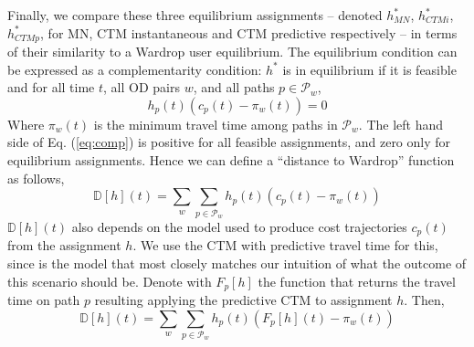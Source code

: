 Finally, we compare these three equilibrium assignments -- denoted $h^*_{MN}$, $h^*_{CTMi}$, $h^*_{CTMp}$, for MN, CTM instantaneous and CTM predictive respectively -- in terms of their similarity to a Wardrop user equilibrium. The equilibrium condition can be expressed as a complementarity condition: $h^*$ is in equilibrium  if it is feasible and for all time $t$, all OD pairs $w$, and all paths $p\in\mathcal{P}_w$,
\begin{equation}
\label{eq:comp}
h_p(t)\left(c_p(t)-\pi_w(t)\right) = 0
\end{equation}
Where $\pi_w(t)$ is the minimum travel time among paths in $\mathcal{P}_w$. The left hand side of Eq. (\ref{eq:comp}) is positive for all feasible assignments, and zero only for equilibrium assignments. Hence we can define a ``distance to Wardrop'' function as follows,
\begin{equation}
\mathbb{D}[h](t) =\sum_w \sum_{p\in\mathcal{P}_w} h_p(t)\left(c_p(t)-\pi_w(t)\right)
\end{equation}
$\mathbb{D}[h](t)$ also depends on the model used to produce cost trajectories $c_p(t)$ from the assignment $h$. We use the CTM with predictive travel time for this, since is the model that most closely matches our intuition of what the outcome of this scenario should be. Denote with $F_p[h]$ the function that returns the travel time on path $p$ resulting applying the predictive CTM to assignment $h$. Then,
\begin{equation}
\mathbb{D}[h](t) =\sum_w \sum_{p\in\mathcal{P}_w} h_p(t)\left(F_p[h](t)-\pi_w(t)\right)
\end{equation}

